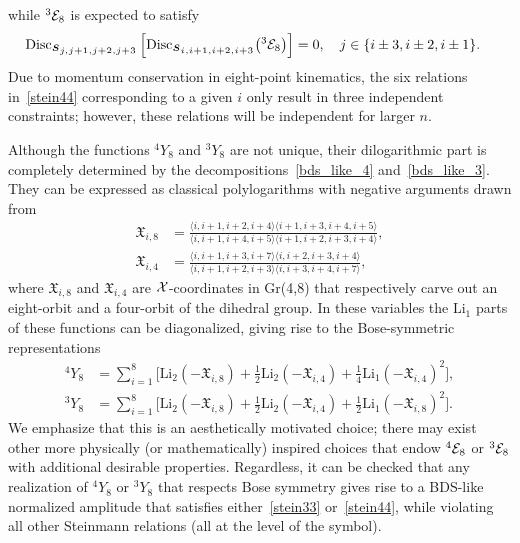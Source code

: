 \documentclass[11pt]{article}
\def\mand#1{\scaleto{s}{4.6pt}_{\scaleto{#1}{5.2pt}}}
\begin{document}
while ${}^3 {\cal E}_8$ is expected to satisfy
\begin{equation}
\begin{split}
\text{Disc}_{\mand{j,j+1,j+2,j+3}}\left[\text{Disc}_{\mand{i,i+1,i+2,i+3}} \big({}^3 {\cal E}_8 \big) \right] &= 0, \quad j \in \{ i \pm 3, i \pm 2, i \pm 1 \}.  \label{stein44}
\end{split}
\end{equation}
Due to momentum conservation in eight-point kinematics, the six relations in~\eqref{stein44} corresponding to a given $i$ only result in three independent constraints; however, these relations will be independent for larger $n$.

Although the functions ${}^4 Y_{8}$ and ${}^3 Y_{8}$ are not unique, their dilogarithmic part is completely determined by the decompositions~\eqref{bds_like_4} and~\eqref{bds_like_3}. They can be expressed as classical polylogarithms with negative arguments drawn from \begin{align}
\mathfrak{X}_{i,8} &= \frac{\langle i,i+1,i+2,i+4 \rangle \langle i+1,i+3,i+4,i+5\rangle}{\langle i,i+1,i+4,i+5 \rangle \langle i+1,i+2,i+3,i+4 \rangle}, \\
\mathfrak{X}_{i,4} &= \frac{\langle i,i+1,i+3,i+7 \rangle \langle i,i+2,i+3,i+4 \rangle}{\langle i,i+1,i+2,i+3 \rangle \langle i,i+3,i+4,i+7 \rangle},
\end{align}
where $\mathfrak{X}_{i,8}$ and $\mathfrak{X}_{i,4}$ are ${\cal X}$-coordinates in Gr(4,8) that respectively carve out an eight-orbit and a four-orbit of the dihedral group. In these variables the $\text{Li}_1$ parts of these functions can be diagonalized, giving rise to the Bose-symmetric representations
\begin{align}
{}^4 Y_8 &= \sum_{i=1}^8 \bigg[ \text{Li}_2 \left( - \mathfrak{X}_{i,8} \right) + \frac12 \text{Li}_2 \left(- \mathfrak{X}_{i,4}  \right) + \frac14 \text{Li}_1\left(- \mathfrak{X}_{i,4} \right)^2 \bigg], \\
{}^3 Y_8 &= \sum_{i=1}^8 \bigg[ \text{Li}_2 \left( - \mathfrak{X}_{i,8} \right) + \frac12 \text{Li}_2 \left(- \mathfrak{X}_{i,4}  \right) + \frac12 \text{Li}_1\left(- \mathfrak{X}_{i,8} \right)^2 \bigg].
\end{align}
We emphasize that this is an aesthetically motivated choice; there may exist other more physically (or mathematically) inspired choices that endow ${}^4 {\cal E}_8$ or ${}^3 {\cal E}_8$ with additional desirable properties. Regardless, it can be checked that any realization of ${}^4 Y_8$ or ${}^3 Y_8$ that respects Bose symmetry gives rise to a BDS-like normalized amplitude that satisfies either~\eqref{stein33} or~\eqref{stein44}, while violating all other Steinmann relations (all at the level of the symbol). 
\end{document}
